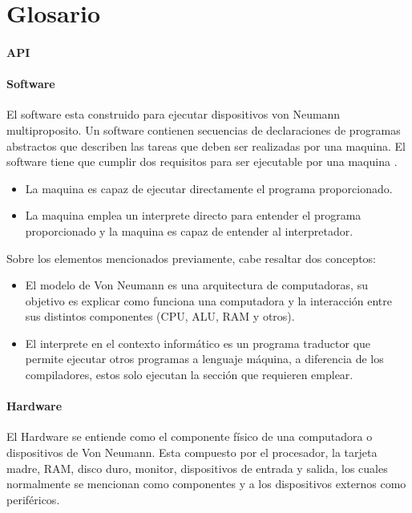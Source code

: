 
\chapter{Glosario}

\subsubsection{API}


\subsubsection{Software}

El software esta construido para ejecutar dispositivos von Neumann multiproposito. Un software contienen secuencias de declaraciones de programas abstractos que describen las tareas que deben ser realizadas por una maquina. El software tiene que cumplir dos requisitos para ser ejecutable por una maquina \cite{councill2001definition}.
\begin{itemize}
	\item La maquina es capaz de ejecutar directamente el programa proporcionado.
	\item La maquina emplea un interprete directo para entender el programa proporcionado y la maquina es capaz de entender al interpretador.
\end{itemize}

Sobre los elementos mencionados previamente, cabe resaltar dos conceptos:
\begin{itemize}
	\item El modelo de Von Neumann es una arquitectura de computadoras, su objetivo es explicar como funciona una computadora y la interacción entre sus distintos componentes (CPU, ALU, RAM y otros).
	\item El interprete en el contexto informático es un programa traductor que permite ejecutar otros programas a lenguaje máquina, a diferencia de los compiladores, estos solo ejecutan la sección que requieren emplear.
\end{itemize}

\subsubsection{Hardware}

El Hardware se entiende como el componente físico de una computadora o dispositivos de Von Neumann. Esta compuesto por el procesador, la tarjeta madre, RAM, disco duro, monitor, dispositivos de entrada y salida, los cuales normalmente se mencionan como componentes y a los dispositivos externos como periféricos\cite{hardwaredef}.


